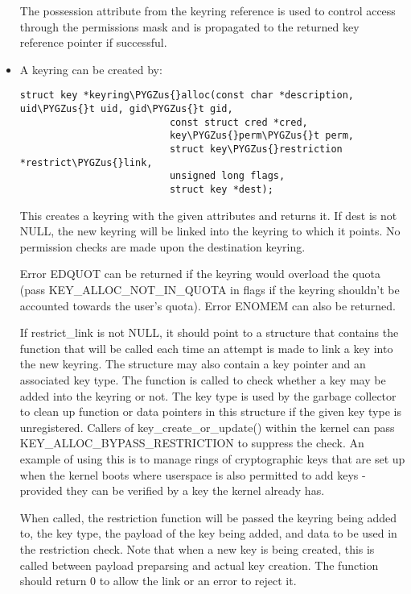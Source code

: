 \documentclass[a4paper,8pt,english]{sphinxmanual}
\def\PYGZus{\char`\_}
\begin{document}
\begin{itemize}
The possession attribute from the keyring reference is used to control
access through the permissions mask and is propagated to the returned key
reference pointer if successful.

\item {} 
A keyring can be created by:

\begin{Verbatim}[commandchars=\\\{\}]
struct key *keyring\PYGZus{}alloc(const char *description, uid\PYGZus{}t uid, gid\PYGZus{}t gid,
                          const struct cred *cred,
                          key\PYGZus{}perm\PYGZus{}t perm,
                          struct key\PYGZus{}restriction *restrict\PYGZus{}link,
                          unsigned long flags,
                          struct key *dest);
\end{Verbatim}

This creates a keyring with the given attributes and returns it.  If dest
is not NULL, the new keyring will be linked into the keyring to which it
points.  No permission checks are made upon the destination keyring.

Error EDQUOT can be returned if the keyring would overload the quota (pass
KEY\_ALLOC\_NOT\_IN\_QUOTA in flags if the keyring shouldn't be accounted
towards the user's quota).  Error ENOMEM can also be returned.

If restrict\_link is not NULL, it should point to a structure that contains
the function that will be called each time an attempt is made to link a
key into the new keyring.  The structure may also contain a key pointer
and an associated key type.  The function is called to check whether a key
may be added into the keyring or not.  The key type is used by the garbage
collector to clean up function or data pointers in this structure if the
given key type is unregistered.  Callers of key\_create\_or\_update() within
the kernel can pass KEY\_ALLOC\_BYPASS\_RESTRICTION to suppress the check.
An example of using this is to manage rings of cryptographic keys that are
set up when the kernel boots where userspace is also permitted to add keys
- provided they can be verified by a key the kernel already has.

When called, the restriction function will be passed the keyring being
added to, the key type, the payload of the key being added, and data to be
used in the restriction check.  Note that when a new key is being created,
this is called between payload preparsing and actual key creation.  The
function should return 0 to allow the link or an error to reject it.


\end{itemize}
\end{document}
